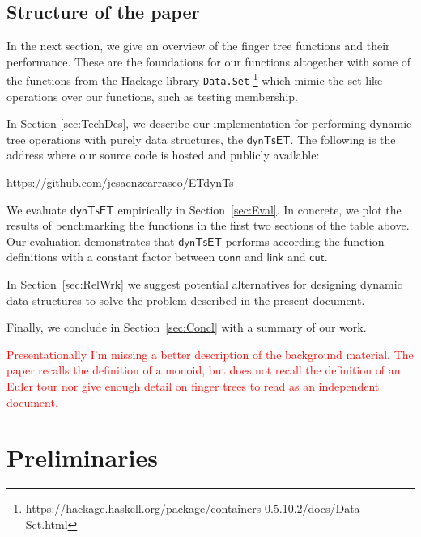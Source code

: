\documentclass{elsarticle}
\newcommand{\tcr} [1]{\textcolor{red}{#1}}
\newcommand{\MATHSF}[1]{\ensuremath{\mathsf{#1}}\xspace}
\newcommand{\link}{\MATHSF{link}}
\newcommand{\cut}{\MATHSF{cut}}
\newcommand{\conn}{\MATHSF{conn}}
\newcommand{\dyntset}{\MATHSF{dynTsET}}
\begin{document}
\subsection*{Structure of the paper}
In the next section, we give an overview of the finger tree functions and their performance. These are the foundations for our functions altogether with some of the functions from the Hackage library \texttt{Data.Set} \footnote{https://hackage.haskell.org/package/containers-0.5.10.2/docs/Data-Set.html} which mimic the set-like operations over our functions, such as testing membership. 

In Section \ref{sec:TechDes}, we describe our implementation for performing dynamic tree operations with purely data structures, the \dyntset. The following is the address where our source code is hosted and publicly available:
\begin{center}
\url{https://github.com/jcsaenzcarrasco/ETdynTs}
\end{center}

We evaluate \dyntset empirically in Section~\ref{sec:Eval}. In concrete, we plot the results of benchmarking the functions in the first two sections of the table above. Our evaluation demonstrates that \dyntset performs according the function definitions with a constant factor between \conn and \link and \cut. 

In Section~\ref{sec:RelWrk} we suggest potential alternatives for designing dynamic data structures to solve the problem described in the present document. 

Finally, we conclude in Section~\ref{sec:Concl} with a summary of our work.


\tcr{Presentationally I'm missing a better description of the background material. The paper recalls the definition of a monoid, but does not recall the definition of an Euler tour nor give enough detail on finger trees to read as an independent document.} 




\section{Preliminaries} 
\label{sec:Prelim} 
\end{document}
